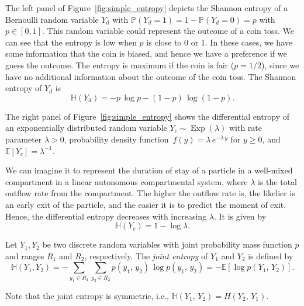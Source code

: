 \documentclass[smallextended]{svjour3}
\renewcommand{\P}{\mathbb{P}}
\newcommand{\E}{\mathbb{E}}
\renewcommand{\H}{\mathbb{H}}
\newcommand{\Exp}{\operatorname{Exp}}
\newcommand{\suml}{\sum\limits}
\newcommand{\ie}{i.e.}
\newcommand{\pdf}{probability density function}
\begin{document}
The left panel of Figure~\ref{fig:simple_entropy} depicts the Shannon entropy of a Bernoulli random variable $Y_d$ with $\P(Y_d=1)=1-\P(Y_d=0)=p$ with $p\in[0,1]$.
This random variable could represent the outcome of a coin toss.
We can see that the entropy is low when $p$ is close to $0$ or $1$.
In these cases, we have some information that the coin is biased, and hence we have a preference if we guess the outcome.
The entropy is maximum if the coin is fair ($p=1/2$), since we have no additional information about the outcome of the coin toss.
The Shannon entropy of $Y_d$ is
\begin{equation*}
	\H(Y_d) = -p\,\log p - (1-p)\,\log(1-p).
\end{equation*}

The right panel of Figure~\ref{fig:simple_entropy} shows the differential entropy of an exponentially distributed random variable $Y_c\sim\Exp(\lambda)$ with rate parameter $\lambda>0$, \pdf\ $f(y) = \lambda\,e^{-\lambda\,y}$ for $y\geq0$, and $\E\left[Y_c\right]=\lambda^{-1}$.

We can imagine it to represent the duration of stay of a particle in a well-mixed compartment in a linear autonomous compartmental system, where $\lambda$ is the total outflow rate from the compartment.
The higher the outflow rate is, the likelier is an early exit of the particle, and the easier it is to predict the moment of exit.
Hence, the differential entropy decreases with increasing $\lambda$.
It is given by
\begin{equation*}
	\H(Y_c) = 1-\log\lambda.
\end{equation*}

\begin{definition}%
		Let $Y_1,Y_2$ be two discrete random variables with joint probability mass function $p$ and ranges $R_1$ and $R_2$, respectively.
		The \emph{joint entropy} of $Y_1$ and $Y_2$ is defined by
		\begin{equation*}
			\H(Y_1,Y_2) = -\suml_{y_1\in R_1}\suml_{y_2\in R_2} p(y_1,\,y_2)\,\log p(y_1,\,y_2) = -\E\left[\log p(Y_1,\,Y_2)\right].
		\end{equation*}
\end{definition}

Note that the joint entropy is symmetric, \ie, $\H(Y_1,\,Y_2) = H(Y_2,\,Y_1)$.
\end{document}
